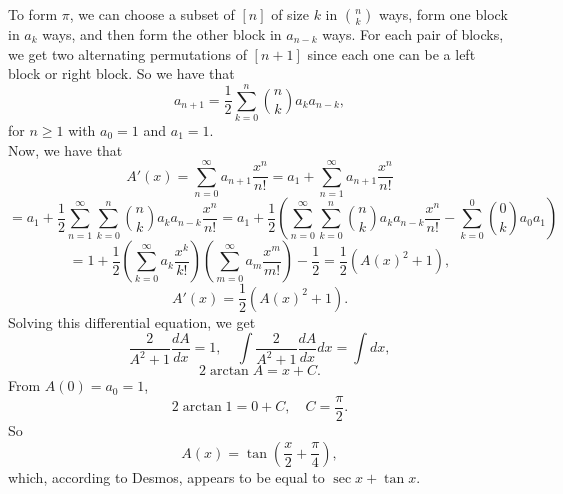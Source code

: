 \documentclass{article}
\newcommand{\bigp}[1]{\left(#1\right)}
\begin{document}
To form $\pi$, we can choose a subset of $[n]$ of size $k$ in $\binom nk$ ways, form one block in $a_k$ ways, and then form the other block in $a_{n - k}$ ways. For each pair of blocks, we get two alternating permutations of $[n + 1]$ since each one can be a left block or right block. So we have that
$$a_{n + 1} = \frac{1}{2}\sum_{k = 0}^n \binom nk a_ka_{n - k},$$
for $n \ge 1$ with $a_0 = 1$ and $a_1 = 1$. \\

Now, we have that
$$A'(x) = \sum_{n = 0}^\infty a_{n + 1}\frac{x^n}{n!} = a_1 + \sum_{n = 1}^\infty a_{n + 1}\frac{x^n}{n!}$$
$$= a_1 + \frac{1}{2}\sum_{n = 1}^\infty\sum_{k = 0}^n \binom nk a_ka_{n - k} \frac{x^n}{n!} = a_1 + \frac{1}{2}\bigp{\sum_{n = 0}^\infty\sum_{k = 0}^n \binom nk a_ka_{n - k} \frac{x^n}{n!} - \sum_{k = 0}^0 \binom 0k a_0a_1}$$
$$= 1 + \frac{1}{2}\bigp{\sum_{k = 0}^\infty a_k \frac{x^k}{k!}}\bigp{\sum_{m = 0}^\infty a_m \frac{x^m}{m!}} - \frac{1}{2} = \frac{1}{2}(A(x)^2 + 1),$$
$$A'(x) = \frac{1}{2}(A(x)^2 + 1).$$
Solving this differential equation, we get
$$\frac{2}{A^2 + 1}\frac{dA}{dx} = 1, \quad \int \frac{2}{A^2 + 1}\frac{dA}{dx}dx = \int dx,$$
$$2\arctan A = x + C.$$
From $A(0) = a_0 = 1$,
$$2\arctan 1 = 0 + C, \quad C = \frac{\pi}{2}.$$
So
$$A(x) = \tan\bigp{\frac{x}{2} + \frac{\pi}{4}},$$
which, according to Desmos, appears to be equal to $\sec x + \tan x$.
\end{document}
